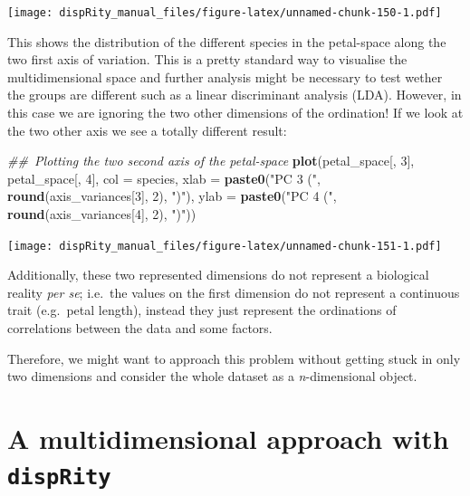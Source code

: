 \documentclass[]{book}
\newenvironment{Shaded}{\begin{snugshade}}{\end{snugshade}}
\newcommand{\CommentTok}[1]{\textcolor[rgb]{0.56,0.35,0.01}{\textit{#1}}}
\newcommand{\DataTypeTok}[1]{\textcolor[rgb]{0.13,0.29,0.53}{#1}}
\newcommand{\DecValTok}[1]{\textcolor[rgb]{0.00,0.00,0.81}{#1}}
\newcommand{\KeywordTok}[1]{\textcolor[rgb]{0.13,0.29,0.53}{\textbf{#1}}}
\newcommand{\NormalTok}[1]{#1}
\newcommand{\StringTok}[1]{\textcolor[rgb]{0.31,0.60,0.02}{#1}}
\begin{document}
\texttt{[image: dispRity\_manual\_files/figure-latex/unnamed-chunk-150-1.pdf]}

This shows the distribution of the different species in the petal-space along the two first axis of variation.
This is a pretty standard way to visualise the multidimensional space and further analysis might be necessary to test wether the groups are different such as a linear discriminant analysis (LDA).
However, in this case we are ignoring the two other dimensions of the ordination!
If we look at the two other axis we see a totally different result:

\begin{Shaded}
\begin{Highlighting}[]
\CommentTok{## Plotting the two second axis of the petal-space}
\KeywordTok{plot}\NormalTok{(petal_space[, }\DecValTok{3}\NormalTok{], petal_space[, }\DecValTok{4}\NormalTok{], }\DataTypeTok{col =}\NormalTok{ species,}
    \DataTypeTok{xlab =} \KeywordTok{paste0}\NormalTok{(}\StringTok{"PC 3 ("}\NormalTok{, }\KeywordTok{round}\NormalTok{(axis_variances[}\DecValTok{3}\NormalTok{], }\DecValTok{2}\NormalTok{), }\StringTok{")"}\NormalTok{),}
    \DataTypeTok{ylab =} \KeywordTok{paste0}\NormalTok{(}\StringTok{"PC 4 ("}\NormalTok{, }\KeywordTok{round}\NormalTok{(axis_variances[}\DecValTok{4}\NormalTok{], }\DecValTok{2}\NormalTok{), }\StringTok{")"}\NormalTok{))}
\end{Highlighting}
\end{Shaded}

\texttt{[image: dispRity\_manual\_files/figure-latex/unnamed-chunk-151-1.pdf]}

Additionally, these two represented dimensions do not represent a biological reality \emph{per se}; i.e.~the values on the first dimension do not represent a continuous trait (e.g.~petal length), instead they just represent the ordinations of correlations between the data and some factors.

Therefore, we might want to approach this problem without getting stuck in only two dimensions and consider the whole dataset as a \emph{n}-dimensional object.

\hypertarget{a-multidimensional-approach-with-disprity}{%
\section{\texorpdfstring{A multidimensional approach with \texttt{dispRity}}{A multidimensional approach with dispRity}}\label{a-multidimensional-approach-with-disprity}}
\end{document}
